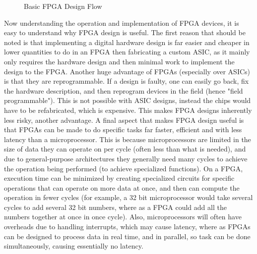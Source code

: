 \documentclass[12pt]{article}
\begin{document}
\begin{figure}[h!]
\begin{center}
\end{center}
\caption{Basic FPGA Design Flow}
\end{figure}
\FloatBarrier

Now understanding the operation and implementation of FPGA devices, it is easy to understand why FPGA design is useful. The first reason that should be noted is that implementing a digital hardware design is far easier and cheaper in lower quantities to do in an FPGA then fabricating a custom ASIC, as it mainly only requires the hardware design and then minimal work to implement the design to the FPGA. Another huge advantage of FPGAs (especially over ASICs) is that they are reprogrammable. If a design is faulty, one can easily go back, fix the hardware description, and then reprogram devices in the field (hence "field programmable"). This is not possible with ASIC designs, instead the chips would have to be refabricated, which is expensive. This makes FPGA designs inherently less risky, another advantage. A final aspect that makes FPGA design useful is that FPGAs can be made to do specific tasks far faster, efficient and with less latency than a microprocessor. This is because microprocessors are limited in the size of data they can operate on per cycle (often less than what is needed), and due to general-purpose architectures they generally need many cycles to achieve the operation being performed (to achieve specialized functions). On a FPGA, execution time can be minimized by creating specialized circuits for specific operations that can operate on more data at once, and then can compute the operation in fewer cycles (for example, a 32 bit microprocessor would take several cycles to add several 32 bit numbers, where as a FPGA could add all the numbers together at once in once cycle). Also, microprocessors will often have overheads due to handling interrupts, which may cause latency, where as FPGAs can be designed to process data in real time, and in parallel, so task can be done simultaneously, causing essentially no latency.
\end{document}
